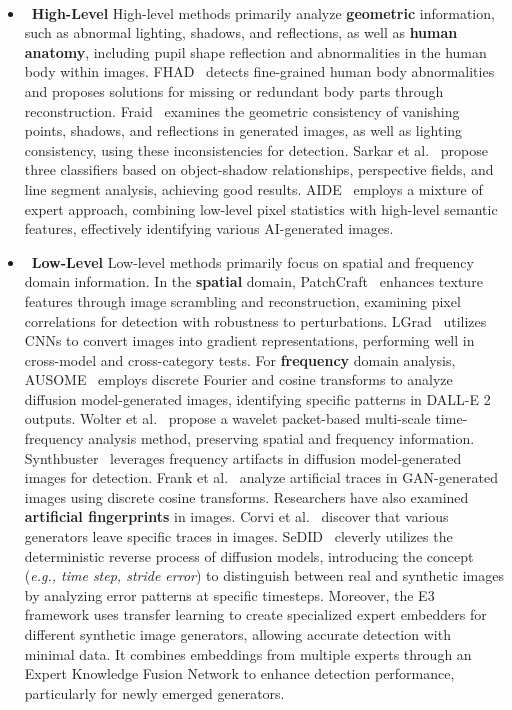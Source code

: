 ~\begin{itemize}
    \item ~\textbf{High-Level}
   High-level methods primarily analyze \textbf{geometric} information, such as abnormal lighting, shadows, and reflections, as well as \textbf{human anatomy}, including pupil shape reflection and abnormalities in the human body within images. FHAD~\cite{wang2024generated} detects fine-grained human body abnormalities and proposes solutions for missing or redundant body parts through reconstruction. Fraid~\cite{farid2022lighting,farid2022perspective} examines the geometric consistency of vanishing points, shadows, and reflections in generated images, as well as lighting consistency, using these inconsistencies for detection. Sarkar et al.~\cite{sarkar2024shadows} propose three classifiers based on object-shadow relationships, perspective fields, and line segment analysis, achieving good results. AIDE~\cite{yan2024sanity} employs a mixture of expert approach, combining low-level pixel statistics with high-level semantic features, effectively identifying various AI-generated images.
    
    \item ~\textbf{Low-Level}
    Low-level methods primarily focus on spatial and frequency domain information. In the \textbf{spatial} domain, PatchCraft~\cite{zhong2024patchcraft} enhances texture features through image scrambling and reconstruction, examining pixel correlations for detection with robustness to perturbations. LGrad~\cite{tan2023learning} utilizes CNNs to convert images into gradient representations, performing well in cross-model and cross-category tests.
    For \textbf{frequency} domain analysis, AUSOME~\cite{poredi2023ausome} employs discrete Fourier and cosine transforms to analyze diffusion model-generated images, identifying specific patterns in DALL-E 2 outputs. Wolter et al.~\cite{wolter2022wavelet} propose a wavelet packet-based multi-scale time-frequency analysis method, preserving spatial and frequency information. Synthbuster~\cite{bammey2023synthbuster} leverages frequency artifacts in diffusion model-generated images for detection. Frank et al.~\cite{frank2020leveraging} analyze artificial traces in GAN-generated images using discrete cosine transforms.
    Researchers have also examined \textbf{artificial fingerprints} in images. Corvi et al.~\cite{corvi2023intriguing} discover that various generators leave specific traces in images. SeDID~\cite{ma2023exposing} cleverly utilizes the deterministic reverse process of diffusion models, introducing the concept (\textit{e.g., time step, stride error}) to distinguish between real and synthetic images by analyzing error patterns at specific timesteps. Moreover, the E3~\cite{azizpour2024e3} framework uses transfer learning to create specialized expert embedders for different synthetic image generators, allowing accurate detection with minimal data. It combines embeddings from multiple experts through an Expert Knowledge Fusion Network to enhance detection performance, particularly for newly emerged generators. 
    

\end{itemize}
